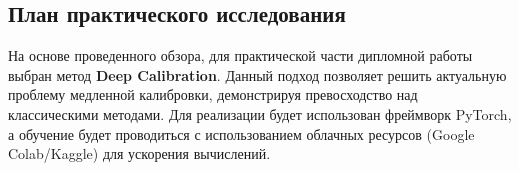 \documentclass[12pt, a4paper]{article}
\begin{document}
\subsection{План практического исследования}
На основе проведенного обзора, для практической части дипломной работы выбран метод \textbf{Deep Calibration}. Данный подход позволяет решить актуальную проблему медленной калибровки, демонстрируя превосходство над классическими методами.
Для реализации будет использован фреймворк PyTorch, а обучение будет проводиться с использованием облачных ресурсов (Google Colab/Kaggle) для ускорения вычислений.

\newpage
\printbibliography
\end{document}
